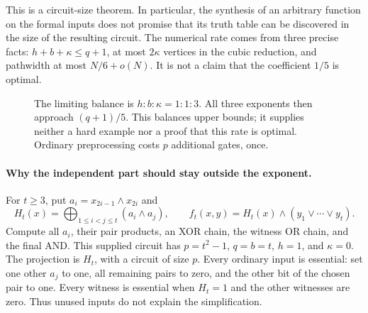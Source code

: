 This is a circuit-size theorem. In particular, the synthesis of an
arbitrary function on the formal inputs does not promise that its
truth table can be discovered in the size of the resulting circuit.
The numerical rate comes from three precise facts: $h+b+\kappa\le q+1$,
at most $2\kappa$ vertices in the cubic reduction, and pathwidth at
most $N/6+o(N)$. It is not a claim that the coefficient $1/5$ is optimal.

\begin{figure}[ht]
\centering
{}
\caption{The limiting balance is $h:b:\kappa=1:1:3$.
All three exponents then approach $(q+1)/5$.
This balances upper bounds; it supplies neither a hard example nor
a proof that this rate is optimal. Ordinary preprocessing costs $p$
additional gates, once.}
\label{fig:consistency-budget}
\end{figure}

\paragraph{Why the independent part should stay outside the exponent.}
For $t\ge3$, put $a_i=x_{2i-1}\land x_{2i}$ and
\[
 H_t(x)=\bigoplus_{1\le i<j\le t}(a_i\land a_j),
 \qquad f_t(x,y)=H_t(x)\land(y_1\lor\cdots\lor y_t).
\]
Compute all $a_i$, their pair products, an XOR chain, the witness OR
chain, and the final AND. This supplied circuit has
$p=t^2-1$, $q=b=t$, $h=1$, and $\kappa=0$.
The projection is $H_t$, with a circuit of size $p$.
Every ordinary input is essential: set one other $a_j$ to one,
all remaining pairs to zero, and the other bit of the chosen pair to
one. Every witness is essential when $H_t=1$ and the other witnesses
are zero. Thus unused inputs do not explain the simplification.

